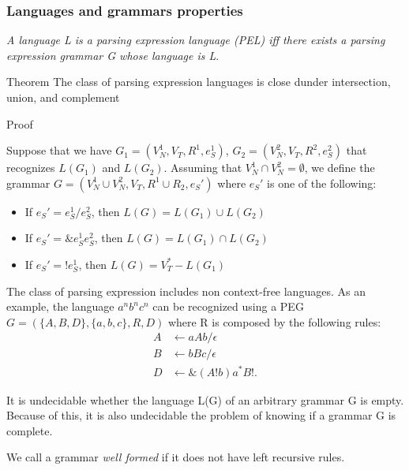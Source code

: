 \begin{frame}
	\small
	\frametitle{Languages and grammars properties}
	\begin{block}{}
		\emph{A language L is a parsing expression language (PEL) iff there exists a parsing expression grammar  G whose language is L}. 
	\end{block}
\begin{block}{Theorem}
	The class of parsing expression languages is close dunder intersection, union, and complement
\end{block}
\begin{block}{Proof}

Suppose that we  have $G_1 = (V_N^1,V_T, R^1,e_S^1)$, $G_2 = (V_N^2,V_T, R^2,e_S^2)$ that recognizes $L(G_1)$ and $L(G_2)$. Assuming that $V_N^1 \cap V_N^2 = \emptyset$, we define the grammar $G=(V_N^1 \cup V_N^2, V_T,R^1 \cup R_2, e_S')$ where $e_S'$ is one of the following:\begin{itemize}
	\item If $e_S' = e_S^1 / e_S^2$, then $L(G) = L(G_1) \cup L(G_2)$
	
	\item If $e_S' = \&e_S^1e_S^2$, then $L(G) = L(G_1) \cap L(G_2)$
	
	\item If $e_S' = !e_S^1$, then $L(G) = V_T^* - L(G_1)$
\end{itemize}
	
\end{block}
\end{frame}

\begin{frame}

	\small
	

	\begin{block}{}
	The class of parsing expression  includes non context-free languages. As an example, the language $a^nb^nc^n$ can be recognized using a PEG $G = (\{A,B,D\},\{a,b,c\},R,D)$ where R is composed by the following rules:
	\begin{align*}
		A  &\leftarrow  a A b / \epsilon \\
		B &\leftarrow bBc / \epsilon \\
		D &\leftarrow\&(A !b)a^*B!.
	\end{align*}
	\end{block}
		\begin{block}{}
		It is undecidable whether the language L(G) of an arbitrary grammar G is empty. Because of this, it is also undecidable the problem of knowing if a grammar G is complete.
	\end{block}
	\begin{block}{}
		We call a grammar \emph{well formed} if it does not have left recursive rules.
	\end{block}
\end{frame}


